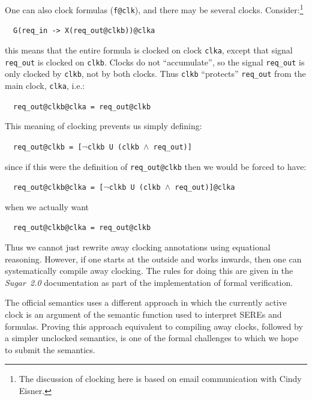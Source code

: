 \documentclass{llncs}
\newcommand\Sugar{{\it{Sugar~2.0}}\xspace}
\begin{document}
One can also clock formulas (\texttt{f@clk}), and there may be
several clocks. Consider:\footnote{The discussion of clocking here is based on email communication
with Cindy Eisner.}

\medskip

~~\texttt{G(req\_in -> X(req\_out@clkb))@clka}

\medskip

\noindent this means that the entire formula is clocked on
clock \texttt{clka}, except that signal \texttt{req\_out} is clocked on \texttt{clkb}. 
Clocks do not ``accumulate'', so
the signal \texttt{req\_out} is only clocked by \texttt{clkb}, not by both clocks.  
Thus \texttt{clkb} ``protects''
\texttt{req\_out} from the main clock, \texttt{clka}, i.e.:

\medskip

~~\texttt{req\_out@clkb@clka = req\_out@clkb}

\medskip

\noindent This meaning of clocking prevents us simply defining:

\medskip

~~\texttt{req\_out@clkb = [$\neg$clkb U (clkb $\wedge$ req\_out)]}

\medskip

\noindent since if this were the definition of \texttt{req\_out@clkb}
then we would be forced to have:

\medskip

~~\texttt{req\_out@clkb@clka = [$\neg$clkb U (clkb $\wedge$ req\_out)]@clka}

\medskip

\noindent when we actually want

\medskip

~~\texttt{req\_out@clkb@clka = req\_out@clkb}

\medskip

Thus we cannot just rewrite away clocking annotations using 
equational reasoning. However, if one starts at the outside and works
inwards, then one can systematically compile away clocking. The rules
for doing this are given in the \Sugar documentation as part of the
implementation of formal verification.

The official semantics uses a different approach in which the
currently active clock is an argument of the semantic function used
to interpret SEREs and formulas.  Proving this approach equivalent to
compiling away clocks, followed by a simpler unclocked semantics, is
one of the formal challenges to which we hope to submit the semantics.
\end{document}
